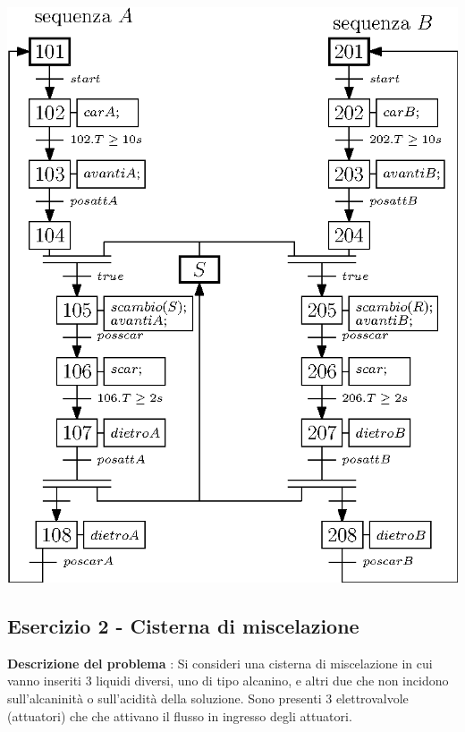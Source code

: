 \documentclass[10pt, letterpaper]{report}
\begin{document}
\begin{center}
    \includegraphics[width=1\textwidth ]{images/SFCCarrelli3.eps}
\end{center}
\subsection{Esercizio 2 - Cisterna di miscelazione}
\textbf{Descrizione del problema} : Si consideri una cisterna di miscelazione in cui vanno inseriti 3 liquidi diversi, uno di tipo alcanino, e altri due che non incidono sull'alcaninità o sull'acidità della soluzione. 
Sono presenti 3 elettrovalvole (attuatori) che che attivano il flusso in ingresso degli attuatori.
\end{document}
